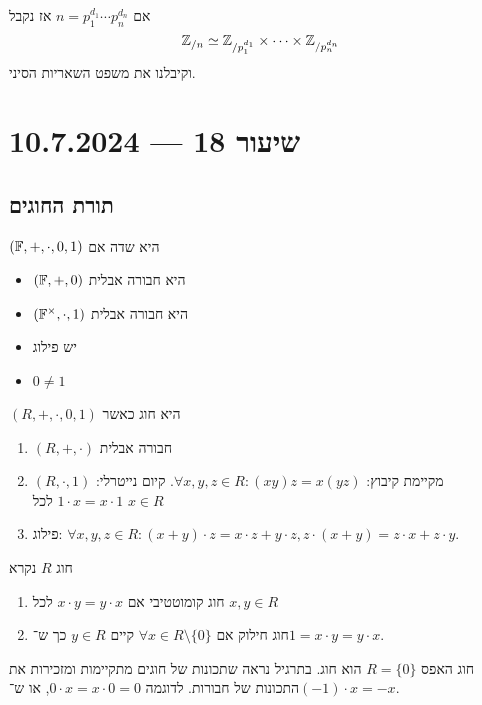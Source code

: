 \begin{example}
	אם $n = p_1^{d_1} \cdots p_n^{d_n}$ אז נקבל
	\[
		\mathbb{Z}_{/n} \simeq \mathbb{Z}_{/p_1^{d_1}} \times \cdots \times \mathbb{Z}_{/p_n^{d_n}} 
	\]
	וקיבלנו את משפט השאריות הסיני.
\end{example}

\section{שיעור 18 --- 10.7.2024}
\subsection{תורת החוגים}
\begin{remark}
	$(\mathbb{F}, +, \cdot, 0, 1)$ היא שדה אם
	\begin{itemize}
		\item $(\mathbb{F}, +, 0)$ היא חבורה אבלית
		\item $(\mathbb{F}^\times, \cdot, 1)$ היא חבורה אבלית
		\item יש פילוג
		\item $0 \ne 1$
	\end{itemize}
\end{remark}
\begin{definition}[חוג]
	$(R, +, \cdot, 0, 1)$ היא חוג כאשר
	\begin{enumerate}
		\item $(R, +, \cdot)$ חבורה אבלית
		\item $(R, \cdot, 1)$ מקיימת
			 קיבוץ: $\forall x, y, z \in R : (xy)z = x(yz)$.
			 קיום נייטרלי: $1 \cdot x = x \cdot 1$ לכל $x \in R$
		\item פילוג: $\forall x, y, z \in R : (x + y) \cdot z = x \cdot z + y \cdot z, z \cdot (x + y) = z \cdot x + z \cdot y$.
	\end{enumerate}
\end{definition}
\begin{definition}
	חוג $R$ נקרא
	\begin{enumerate}
		\item חוג קומוטטיבי אם $x \cdot y = y \cdot x$ לכל $x, y \in R$
		\item חוג חילוק אם $\forall x \in R \setminus \{ 0 \}$ קיים $y \in R$ כך ש־$1 = x \cdot y = y \cdot x$.
	\end{enumerate}
\end{definition}
חוג האפס $R = \{ 0 \}$ הוא חוג.
בתרגיל נראה שתכונות של חוגים מתקיימות ומזכירות את התכונות של חבורות.
לדוגמה $0 \cdot x = x \cdot 0 = 0$, או ש־$(-1) \cdot x = -x$.
